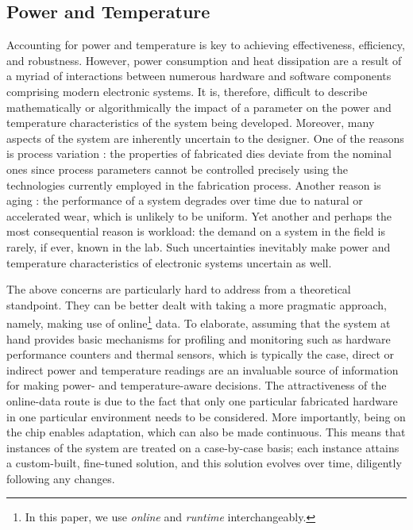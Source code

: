 \subsection{Power and Temperature}
Accounting for power and temperature is key to achieving effectiveness,
efficiency, and robustness. However, power consumption and heat dissipation are
a result of a myriad of interactions between numerous hardware and software
components comprising modern electronic systems. It is, therefore, difficult to
describe mathematically or algorithmically the impact of a parameter on the
power and temperature characteristics of the system being developed. Moreover,
many aspects of the system are inherently uncertain to the designer. One of the
reasons is process variation \cite{chandrakasan2000}: the properties of
fabricated dies deviate from the nominal ones since process parameters cannot be
controlled precisely using the technologies currently employed in the
fabrication process. Another reason is aging \cite{coskun2006}: the performance
of a system degrades over time due to natural or accelerated wear, which is
unlikely to be uniform. Yet another and perhaps the most consequential reason is
workload: the demand on a system in the field is rarely, if ever, known in the
lab. Such uncertainties inevitably make power and temperature characteristics of
electronic systems uncertain as well.

The above concerns are particularly hard to address from a theoretical
standpoint. They can be better dealt with taking a more pragmatic approach,
namely, making use of online\footnote{In this paper, we use \emph{online} and
\emph{runtime} interchangeably.} data. To elaborate, assuming that the system at
hand provides basic mechanisms for profiling and monitoring such as hardware
performance counters and thermal sensors, which is typically the case, direct or
indirect power and temperature readings are an invaluable source of information
for making power- and temperature-aware decisions. The attractiveness of the
online-data route is due to the fact that only one particular fabricated
hardware in one particular environment needs to be considered. More importantly,
being on the chip enables adaptation, which can also be made continuous. This
means that instances of the system are treated on a case-by-case basis; each
instance attains a custom-built, fine-tuned solution, and this solution evolves
over time, diligently following any changes.

